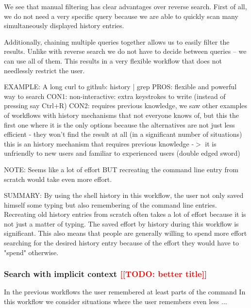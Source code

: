 \documentclass[thesis=M,english]{FITthesis}[2012/10/20]
\newcommand{\todotext}[1]{\textcolor{red}{\textbf{[[#1]]}}}
\newcommand{\redtext}[1]{\textcolor{red}{[[#1]]}}
\begin{document}
We see that manual filtering has clear advantages over reverse search. First of all, we do not need a very specific query because we are able to quickly scan many simultaneously displayed history entries. 

Additionally, chaining multiple queries together allows us to easily filter the results. Unlike with reverse search we do not have to decide between queries -- we can use all of them. This results in a very flexible workflow that does not needlessly restrict the user.



EXAMPLE: A long curl to github: history | grep
PROS: flexible and powerful way to search
CON1: non-interactive: extra keystrokes to write (instead of pressing say Ctrl+R)
CON2: requires previous knowledge, we saw other examples of workflows with history mechanisms that not everyone knows of, but this the first one where it is the only options because the alternatives are not just less efficient - they won't find the result at all (in a significant number of situations)
this is an history mechanism that requires previous knowledge -$>$ it is unfriendly to new users and familiar to experienced users (double edged sword)

NOTE: Seems like a lot of effort BUT recreating the command line entry from scratch would take even more effort.

SUMMARY: By using the shell history in this workflow, the user not only saved himself some typing but also remembering of the command line entries. Recreating old history entries from scratch often takes a lot of effort because it is not just a matter of typing. The saved effort by history during this workflow is significant. This also means that people are generally willing to spend more effort searching for the desired history entry because of the effort they would have to "spend" otherwise.




\subsubsection*{Search with implicit context \redtext{TODO: better title}}
In the previous workflows the user remembered at least parts of the command
In this workflow we consider situations where the user remembers even less ... 
\end{document}
